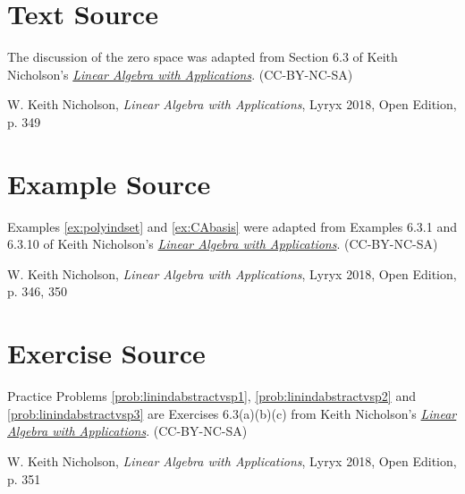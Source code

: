 \documentclass{ximera}
\begin{document}
\section*{Text Source} The discussion of the zero space was adapted from Section 6.3 of Keith Nicholson's \href{https://open.umn.edu/opentextbooks/textbooks/linear-algebra-with-applications}{\it Linear Algebra with Applications}. (CC-BY-NC-SA)

W. Keith Nicholson, {\it Linear Algebra with Applications}, Lyryx 2018, Open Edition, p. 349 

\section*{Example Source}
Examples \ref{ex:polyindset} and \ref{ex:CAbasis} were adapted from Examples 6.3.1 and 6.3.10 of Keith Nicholson's \href{https://open.umn.edu/opentextbooks/textbooks/linear-algebra-with-applications}{\it Linear Algebra with Applications}. (CC-BY-NC-SA)

W. Keith Nicholson, {\it Linear Algebra with Applications}, Lyryx 2018, Open Edition, p. 346, 350

\section*{Exercise Source}
Practice Problems \ref{prob:linindabstractvsp1}, \ref{prob:linindabstractvsp2} and \ref{prob:linindabstractvsp3} are Exercises 6.3(a)(b)(c) from Keith Nicholson's \href{https://open.umn.edu/opentextbooks/textbooks/linear-algebra-with-applications}{\it Linear Algebra with Applications}. (CC-BY-NC-SA)

W. Keith Nicholson, {\it Linear Algebra with Applications}, Lyryx 2018, Open Edition, p. 351
\end{document}
